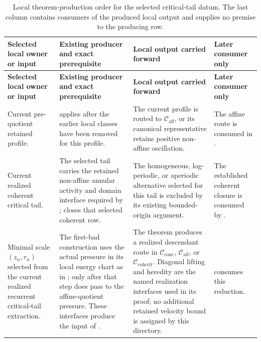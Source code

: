 \documentclass[11pt]{amsart}
\numberwithin{equation}{section}
\theoremstyle{plain}
\theoremstyle{definition}
\theoremstyle{remark}
\newcommand{\Cactive}{\mathcal C_{\mathrm{conc}}}
\newcommand{\Caff}{\mathcal C_{\mathrm{aff}}}
\newcommand{\Ccohcrit}{\mathcal C_{\mathrm{cohcrit}}}
\begin{document}
\begingroup
\scriptsize
\setlength{\tabcolsep}{2pt}
\renewcommand{\arraystretch}{1.18}
\begin{longtable}{@{}L{0.18\textwidth}L{0.25\textwidth}L{0.27\textwidth}L{0.22\textwidth}@{}}
\caption{Local theorem-production order for the selected critical-tail datum.
The last column contains consumers of the produced local output and supplies no
premise to the producing row.}
\label{tab:critical-tail-local-dependency-directory}\\
\hline
\textbf{Selected local owner or input} & \textbf{Existing producer and exact prerequisite} &
\textbf{Local output carried forward} & \textbf{Later consumer only}\\
\hline
\endfirsthead
\hline
\textbf{Selected local owner or input} & \textbf{Existing producer and exact prerequisite} &
\textbf{Local output carried forward} & \textbf{Later consumer only}\\
\hline
\endhead
\hline
\endfoot
Current pre-quotient retained profile. &
 applies after the earlier local
classes have been removed for this profile. &
The current profile is routed to \(\Caff\), or its canonical representative
retains positive non-affine oscillation. &
The affine route is consumed in
.\\

Current realized coherent critical tail. &
The selected tail carries the retained non-affine annular activity and domain
interface required by
;
 closes that selected coherent
row. &
The homogeneous, log-periodic, or aperiodic alternative selected for this tail
is excluded by its existing bounded-origin argument. &
The established coherent closure is consumed by
.\\

Minimal scale \((z_n,r_n)\) selected from the current realized recurrent
critical-tail extraction. &
The first-bad construction uses the actual pressure in its local energy chart
as in ; only after that step does
 pass to the affine-quotient pressure.
These interfaces produce the input of
. &
The theorem produces a realized descendant route in
\(\Cactive\), \(\Caff\), or \(\Ccohcrit\).  Diagonal lifting and heredity are
the named realization interfaces used in its proof; no additional retained
velocity bound is assigned by this directory. &
 consumes this reduction.\\


\end{longtable}
\end{document}

